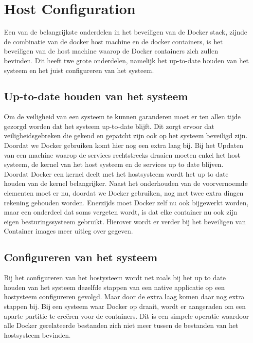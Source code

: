 \section{Host Configuration}

Een van de belangrijkste onderdelen in het beveiligen van de Docker stack, zijnde de combinatie van de docker host machine en de docker containers, is het beveiligen van de host machine waarop de Docker containers zich zullen bevinden. Dit heeft twe grote onderdelen, namelijk het up-to-date houden van het systeem en het juist configureren van het systeem.

\subsection{Up-to-date houden van het systeem}

Om de veiligheid van een systeem te kunnen garanderen moet er ten allen tijde gezorgd worden dat het systeem up-to-date blijft. Dit zorgt ervoor dat veiligheidsgebreken die gekend en gepatcht zijn ook op het systeem beveiligd zijn. Doordat we Docker gebruiken komt hier nog een extra laag bij. Bij het Updaten van een machine waarop de services rechtstreeks draaien moeten enkel het host systeem, de kernel van het host systeem en de services up to date blijven. Doordat Docker een kernel deelt met het hostsysteem wordt het up to date houden van de kernel belangrijker. Naast het onderhouden van de voorvernoemde elementen moet er nu, doordat we Docker gebruiken, nog met twee extra dingen rekening gehouden worden. Enerzijds moet Docker zelf nu ook bijgewerkt worden, maar een onderdeel dat soms vergeten wordt, is dat elke container nu ook zijn eigen besturingssysteem gebruikt. Hierover wordt er verder bij het beveiligen van Container images meer uitleg over gegeven.


\subsection{Configureren van het systeem}

Bij het configureren van het hostysteem wordt net zoals bij het up to date houden van het systeem dezelfde stappen van een native applicatie op een hostysteem configureren gevolgd. Maar door de extra laag komen daar nog extra stappen bij. Bij een systeem waar Docker op draait, wordt er aangeraden om een aparte partitie te creëren voor de containers. Dit is een simpele operatie waardoor alle Docker gerelateerde bestanden zich niet meer tussen de bestanden van het hostsysteem bevinden.

